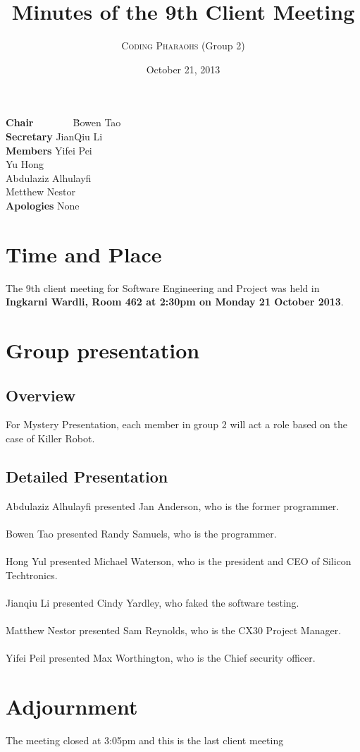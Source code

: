 \documentclass[12pt, a4paper]{article}
\title{Minutes of the 9th Client Meeting}
\author{\textsc{Coding Pharaohs} (Group 2)}
\date{October 21, 2013}
\begin{document}
\maketitle

\begin{tabbing}
\textbf{Chair}~~~~~~~~\=Bowen Tao        \\
\textbf{Secretary}    \>JianQiu Li     \\
\textbf{Members}      \>Yifei Pei  \\
                      \>Yu Hong           \\
                      \> Abdulaziz Alhulayfi            \\
                      \>Metthew Nestor            \\
\textbf{Apologies}    \>None                \\
\end{tabbing}

\section{Time and Place}

The 9th client meeting for Software Engineering and Project was held in \textbf{Ingkarni
Wardli, Room 462 \textnormal{at} 2:30pm \textnormal{on} Monday 21 October 2013}.


\section{ Group presentation}

\subsection{Overview}

For Mystery Presentation, each member in group 2 will act a role based on the case of Killer Robot.

\subsection{Detailed Presentation}

Abdulaziz Alhulayfi presented Jan Anderson, who is the former programmer.\\
\\
Bowen Tao presented Randy Samuels, who is the programmer.\\
\\
Hong Yul presented Michael Waterson, who is the president and CEO of Silicon Techtronics.\\
\\
Jianqiu Li presented Cindy Yardley, who faked the software testing.\\
\\
Matthew Nestor presented Sam Reynolds, who is the CX30 Project Manager.\\
\\
Yifei Peil presented Max Worthington, who is the Chief security officer.\\




\section{Adjournment}
The meeting closed at 3:05pm and this is the last client meeting\\
\\
\end{document}
